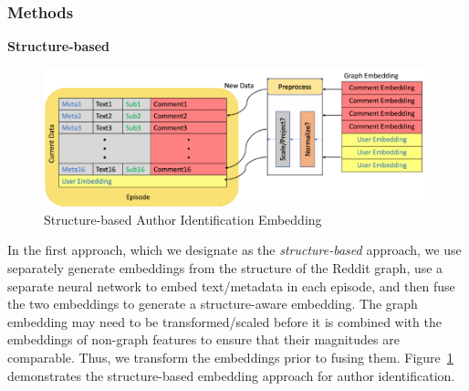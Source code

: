\subsubsection{Methods}
\textbf{Structure-based}
\begin{figure}
    \centering
    \includegraphics[width=0.9\linewidth]{future_work/figures/reddit_structure_based.pdf}
    \caption{Structure-based Author Identification Embedding}
    \label{fig:future_work:scale:preliminary:reddit_structure_embedding}
\end{figure}
In the first approach, which we designate as the \textit{structure-based} approach, we use separately generate embeddings from the structure of the Reddit graph, use a separate neural network to embed text/metadata in each episode, and then fuse the two embeddings to generate a structure-aware embedding. 
The graph embedding may need to be transformed/scaled before it is combined with the embeddings of non-graph features to ensure that their magnitudes are comparable.
Thus, we transform the embeddings prior to fusing them.
Figure~\ref{fig:future_work:scale:preliminary:reddit_structure_embedding} demonstrates the structure-based embedding approach for author identification.

